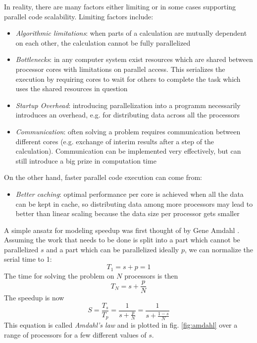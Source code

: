 \documentclass[main.tex]{subfiles}
\begin{document}
In reality, there are many factors either limiting or in some cases supporting parallel code scalability. Limiting factors include:
\begin{itemize}
    \item \emph{Algorithmic limitations}: when parts of a calculation are mutually dependent on each other, the calculation cannot be fully parallelized
    \item \emph{Bottlenecks}: in any computer system exist resources which are shared between processor cores with limitations on parallel access. This serializes the execution by requiring cores to wait for others to complete the task which uses the shared resources in question
    \item \emph{Startup Overhead}: introducing parallelization into a programm necessarily introduces an overhead, e.g. for distributing data across all the processors
    \item \emph{Communication}: often solving a problem requires communication between different cores (e.g. exchange of interim results after a step of the calculation). Communication can be implemented very effectively, but can still introduce a big prize in computation time
\end{itemize}
On the other hand, faster parallel code execution can come from:
\begin{itemize}
    \item \emph{Better caching}: optimal performance per core is achieved when all the data can be kept in cache, so distributing data among more processors may lead to better than linear scaling because the data size per processor gets smaller
\end{itemize}

A simple ansatz for modeling speedup was first thought of by Gene Amdahl \cite{amdahl_validity_1967}.
Assuming the work that needs to be done is split into a part which cannot be parallelized \(s\) and a part which can be parallelized ideally \(p\), we can normalize the serial time to 1:
\begin{equation}
    T_1 = s + p = 1
\end{equation}
The time for solving the problem on \(N\) processors is then
\begin{equation}
    T_N = s + \frac{p}{N}
\end{equation}
The speedup is now
\begin{equation}\label{eq:amdahls_law}
    S = \frac{T_s}{T_p} = \frac{1}{s + \frac{p}{N}} = \frac{1}{s + \frac{1 - s}{N}}
\end{equation}
This equation is called \emph{Amdahl's law} and is plotted in fig. \ref{fig:amdahl} over a range of processors for a few different values of \(s\).
\end{document}
